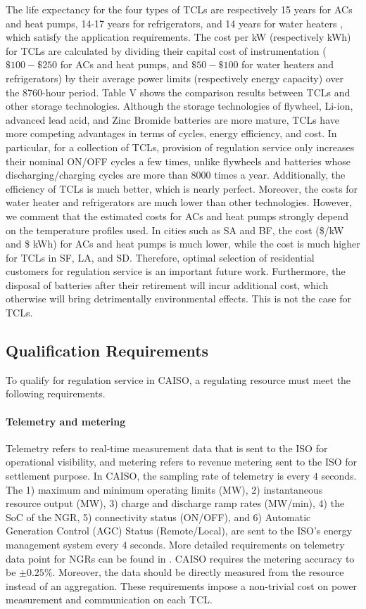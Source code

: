 \documentclass[onecolumn,journal]{IEEEtran}
\begin{document}
The life expectancy for the four types of \acp{TCL} are respectively 15 years for ACs and heat pumps, 14-17 years for refrigerators, and 14 years for water heaters \cite{TCL_life}, which satisfy the application requirements. The cost per kW (respectively kWh) for TCLs are calculated by dividing their capital cost of instrumentation ($\$100-\$250$ for ACs and heat pumps, and $\$50-\$100$ for water heaters and refrigerators) by their average power limits (respectively energy capacity) over the 8760-hour period. Table V shows the comparison results between \acp{TCL} and other storage technologies. Although the storage technologies of flywheel, Li-ion, advanced lead acid, and  Zinc Bromide batteries are more mature,  \acp{TCL} have more competing advantages in terms of cycles, energy efficiency, and cost. In particular, for a collection of \acp{TCL}, provision of regulation service only increases their nominal ON/OFF cycles a few times, unlike flywheels and batteries whose discharging/charging cycles are more than $8000$ times a year. Additionally, the efficiency of \acp{TCL} is much better, which is nearly perfect. Moreover, the costs for water heater and refrigerators are much lower than other technologies. However, we comment that the estimated costs for ACs and heat pumps strongly depend on the temperature profiles used. In cities such as SA and BF, the cost (\$/kW and \$ kWh) for ACs and heat pumps is much lower, while the cost is much higher for TCLs in SF, LA, and SD. Therefore, optimal selection of residential customers for regulation service is an important future work. Furthermore, the disposal of batteries after their retirement will incur additional cost, which otherwise will bring detrimentally environmental effects. This is not the case for TCLs.

\subsection{Qualification Requirements}\label{sec:qualification}
To qualify for regulation service in \ac{CAISO}, a regulating resource must meet the following requirements.

\paragraph{Telemetry and metering} Telemetry refers to real-time measurement data that is sent to the ISO for operational visibility, and metering refers to revenue metering sent to the ISO for settlement purpose.  In \ac{CAISO}, the sampling rate of telemetry is every $4$ seconds. The 1) maximum and minimum operating limits (MW), 2) instantaneous resource output (MW), 3) charge and discharge ramp rates (MW/min), 4) the SoC of the NGR, 5) connectivity status (ON/OFF), and 6) Automatic Generation Control (AGC) Status (Remote/Local), are sent to the ISO's energy management system every $4$ seconds. More detailed requirements on telemetry data point for NGRs can be found in \cite{CAISO_Telemetry}. \ac{CAISO} requires the metering accuracy to be $\pm 0.25\%$. Moreover, the data should be directly measured from the resource instead of an aggregation. These requirements impose a non-trivial cost on power measurement and communication on each \ac{TCL}.
\end{document}

